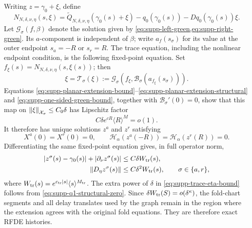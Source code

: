 Writing \(z=\gamma_0+\xi\), define
\begin{equation*}
 N_{N,\delta,\nu,\eta}(s,\xi)
 =\widetilde Q_{N,\delta,\nu,\eta}(\gamma_0(s)+\xi)
   -q_0(\gamma_0(s))-Dq_0(\gamma_0(s))\xi.
\end{equation*}
Let \(\mathcal G_\sigma(f,\beta)\) denote the solution given by
\cref{eq:supp-left-green,eq:supp-right-green}.  Its \(a\)-component is
independent of \(\beta\); write \(a_f(s_\sigma)\) for its value at the
outer endpoint \(s_a=-R\) or \(s_r=R\).  The trace equation, including the
nonlinear endpoint condition, is the following fixed-point equation.  Set
\(f_\xi(s)=N_{N,\delta,\nu,\eta}(s,\xi(s))\); then
\begin{equation}
 \xi=\mathcal T_\sigma(\xi)
 :=\mathcal G_\sigma\!\left(
   f_\xi,\mathcal B_\sigma(a_{f_\xi}(s_\sigma))
   \right).
 \label{eq:supp-trace-fixed-point}
\end{equation}
Equations
\eqref{eq:supp-planar-extension-bound}--\eqref{eq:supp-planar-extension-structural}
and \eqref{eq:supp-one-sided-green-bound}, together with
\(\mathcal B_\sigma'(0)=0\), show that this map on
\(\left\lVert\xi\right\rVert_{\mathcal X_\sigma}\le C_0\delta\) has Lipschitz factor
\begin{equation}
 C\delta e^{cR}\langle R\rangle^M=o(1).
 \label{eq:supp-trace-contraction}
\end{equation}
It therefore has unique solutions \(z^a\) and \(z^r\) satisfying
\begin{equation}
 X^a(0)=X^r(0)=0,\qquad
 \mathscr H_\alpha(z^a(-R))
 =\mathscr H_\alpha(z^r(R))=0.
 \label{eq:supp-trace-conditions}
\end{equation}
Differentiating the same fixed-point equation gives, in full operator norm,
\begin{align}
 \left\lvert z^\sigma(s)-\gamma_0(s)\right\rvert
 +\left\lvert\partial_\nu z^\sigma(s)\right\rvert
 &\le C\delta W_{\rm tr}(s),
 \label{eq:supp-trace-nu-bound}\\
 \left\lVert D_\eta z^\sigma(s)\right\rVert
 &\le C\delta^2W_{\rm tr}(s),
 \qquad \sigma\in\{a,r\},
 \label{eq:supp-trace-eta-bound}
\end{align}
where \(W_{\rm tr}(s)=e^{c_{\rm tr}\left\lvert s\right\rvert}
\langle s\rangle^{M_{\rm tr}}\).  The extra power of \(\delta\) in
\eqref{eq:supp-trace-eta-bound} follows from
\eqref{eq:supp-q1-structural-zero}.  Since
\(\delta W_{\rm tr}(S)=o(\delta^\kappa)\), the fold-chart segments and all delay
translates used by the graph remain in the region where the extension agrees
with the original fold equations.  They are therefore exact RFDE histories.

